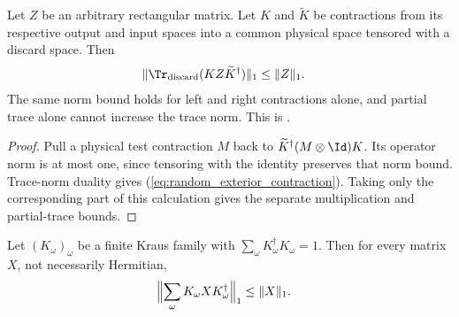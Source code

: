 \begin{theorem}
    \label{thm:random_exterior_contraction}
    \leanok
    Let $Z$ be an arbitrary rectangular matrix. Let $K$ and
    $\widetilde K$ be contractions from its respective output and input
    spaces into a common physical space tensored with a discard space.
    Then
    \begin{align}
        \lVert\Tr_{\mathrm{discard}}(KZ\widetilde K^\dagger)\rVert_1
         & \leq\lVert Z\rVert_1.
        \label{eq:random_exterior_contraction}
    \end{align}
    The same norm bound holds for left and right contractions alone,
    and partial trace alone cannot increase the trace norm.
    This is \cite[Equation~(5.13)]{OpenAI2026PolynomialPEPS}.
\end{theorem}

\begin{proof}\leanok
    Pull a physical test contraction $M$ back to
    $\widetilde K^\dagger(M\otimes\Id)K$. Its operator norm is at most one,
    since tensoring with the identity preserves that norm bound.
    Trace-norm duality gives (\ref{eq:random_exterior_contraction}).
    Taking only the corresponding part of this calculation gives the
    separate multiplication and partial-trace bounds.
\end{proof}

\begin{lemma}
    \label{lem:random_kraus_trace_norm_contraction}
    \leanok
    Let $(K_\omega)_\omega$ be a finite Kraus family with
    $\sum_\omega K_\omega^\dagger K_\omega=1$. Then for every matrix $X$, not necessarily
    Hermitian,
    \begin{align}
        \Bigl\lVert\sum_\omega K_\omega XK_\omega^\dagger\Bigr\rVert_1 & \leq\lVert X\rVert_1.
        \notag
    \end{align}
\end{lemma}

